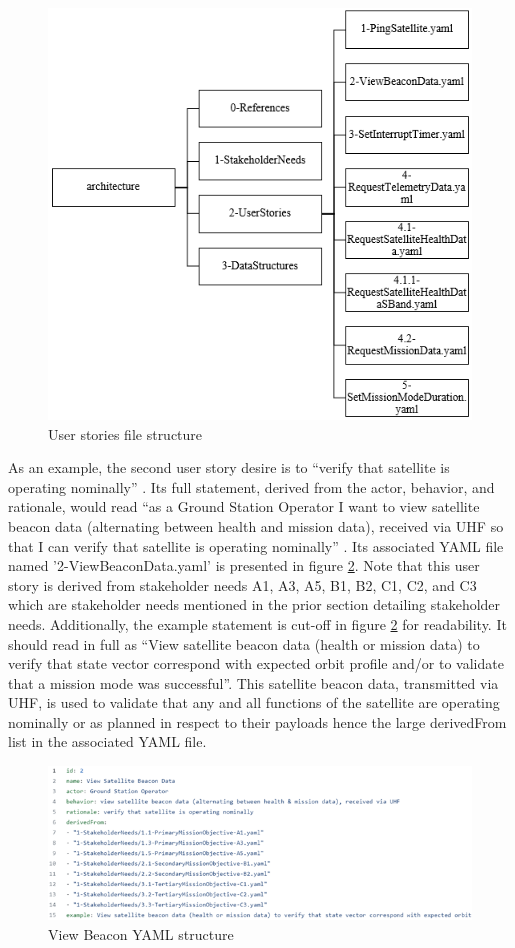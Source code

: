 \documentclass[journal,article,submit,pdftex,moreauthors]{Definitions/mdpi}
\begin{document}
\begin{figure}[H]
    \includegraphics[width=10.5 cm]{assets/userstory_file.png}
    \caption{User stories file structure}
	\label{fig:userstory_file}
    \end{figure}
	\noindent   
\unskip

As an example, the second user story desire is to “verify that satellite is operating nominally” \cite{sealion_mission_architecture}.  Its full statement, derived from the actor, behavior, and rationale, would read “as a Ground Station Operator I want to view satellite beacon data (alternating between health and mission data), received via UHF so that I can verify that satellite is operating nominally” \cite{sealion_page}.  Its associated YAML file named '2-ViewBeaconData.yaml' is presented in figure \ref{fig:view_beacon}.  Note that this user story is derived from stakeholder needs A1, A3, A5, B1, B2, C1, C2, and C3 which are stakeholder needs mentioned in the prior section detailing stakeholder needs.  Additionally, the example statement is cut-off in figure \ref{fig:view_beacon} for readability.  It should read in full as “View satellite beacon data (health or mission data) to verify that state vector correspond with expected orbit profile and/or to validate that a mission mode was successful”.  This satellite beacon data, transmitted via UHF, is used to validate that any and all functions of the satellite are operating nominally or as planned in respect to their payloads hence the large derivedFrom list in the associated YAML file.

\begin{figure}[H]
    \includegraphics[width=10.5 cm]{assets/view_beacon.png}
    \caption{View Beacon YAML structure}
	\label{fig:view_beacon}
    \end{figure}
	\noindent   
\unskip
\end{document}
